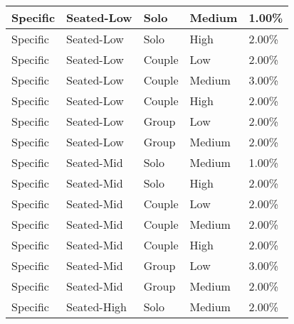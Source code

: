 \begin{longtable}{|l|l|l|l|l|}
    Specific                 & Seated-Low               & Solo               & Medium               & 1.00\%              \\
    \hline
    Specific                 & Seated-Low               & Solo               & High                 & 2.00\%              \\
    \hline
    Specific                 & Seated-Low               & Couple             & Low                  & 2.00\%              \\
    \hline
    Specific                 & Seated-Low               & Couple             & Medium               & 3.00\%              \\
    \hline
    Specific                 & Seated-Low               & Couple             & High                 & 2.00\%              \\
    \hline
    Specific                 & Seated-Low               & Group              & Low                  & 2.00\%              \\
    \hline
    Specific                 & Seated-Low               & Group              & Medium               & 2.00\%              \\
    \hline
    Specific                 & Seated-Mid               & Solo               & Medium               & 1.00\%              \\
    \hline
    Specific                 & Seated-Mid               & Solo               & High                 & 2.00\%              \\
    \hline
    Specific                 & Seated-Mid               & Couple             & Low                  & 2.00\%              \\
    \hline
    Specific                 & Seated-Mid               & Couple             & Medium               & 2.00\%              \\
    \hline
    Specific                 & Seated-Mid               & Couple             & High                 & 2.00\%              \\
    \hline
    Specific                 & Seated-Mid               & Group              & Low                  & 3.00\%              \\
    \hline
    Specific                 & Seated-Mid               & Group              & Medium               & 2.00\%              \\
    \hline
    Specific                 & Seated-High              & Solo               & Medium               & 2.00\%              \\

\end{longtable}
